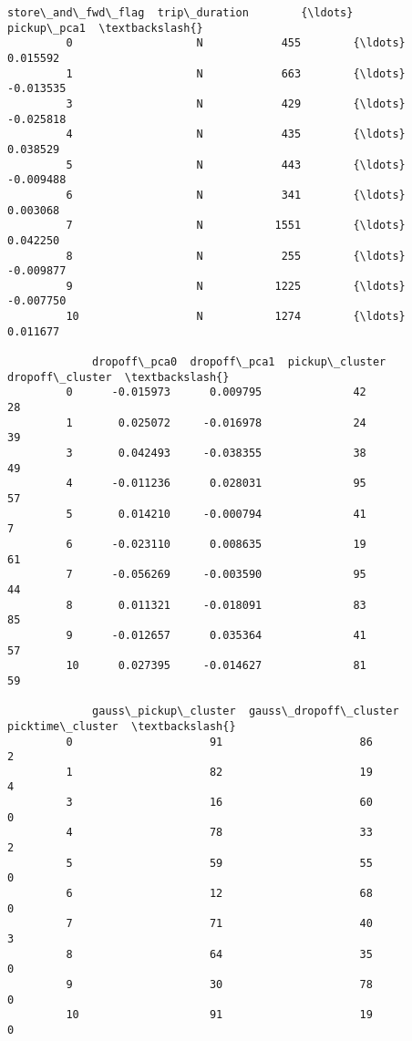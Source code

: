 \documentclass[11pt]{article}
\begin{document}
\begin{Verbatim}[commandchars=\\\{\}]
            store\_and\_fwd\_flag  trip\_duration        {\ldots}          pickup\_pca1  \textbackslash{}
         0                   N            455        {\ldots}             0.015592   
         1                   N            663        {\ldots}            -0.013535   
         3                   N            429        {\ldots}            -0.025818   
         4                   N            435        {\ldots}             0.038529   
         5                   N            443        {\ldots}            -0.009488   
         6                   N            341        {\ldots}             0.003068   
         7                   N           1551        {\ldots}             0.042250   
         8                   N            255        {\ldots}            -0.009877   
         9                   N           1225        {\ldots}            -0.007750   
         10                  N           1274        {\ldots}             0.011677   
         
             dropoff\_pca0  dropoff\_pca1  pickup\_cluster  dropoff\_cluster  \textbackslash{}
         0      -0.015973      0.009795              42               28   
         1       0.025072     -0.016978              24               39   
         3       0.042493     -0.038355              38               49   
         4      -0.011236      0.028031              95               57   
         5       0.014210     -0.000794              41                7   
         6      -0.023110      0.008635              19               61   
         7      -0.056269     -0.003590              95               44   
         8       0.011321     -0.018091              83               85   
         9      -0.012657      0.035364              41               57   
         10      0.027395     -0.014627              81               59   
         
             gauss\_pickup\_cluster  gauss\_dropoff\_cluster  picktime\_cluster  \textbackslash{}
         0                     91                     86                 2   
         1                     82                     19                 4   
         3                     16                     60                 0   
         4                     78                     33                 2   
         5                     59                     55                 0   
         6                     12                     68                 0   
         7                     71                     40                 3   
         8                     64                     35                 0   
         9                     30                     78                 0   
         10                    91                     19                 0   
         

\end{Verbatim}
\end{document}
